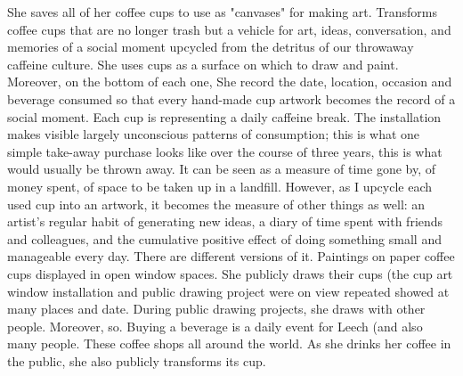 
She saves all of her coffee cups to use as "canvases" for making art. Transforms coffee cups that are no longer trash but a vehicle for art, ideas, conversation, and memories of a social moment upcycled from the detritus of our throwaway caffeine culture. She uses cups as a surface on which to draw and paint. Moreover, on the bottom of each one, She record the date, location, occasion and beverage consumed so that every hand-made cup artwork becomes the record of a social moment. Each cup is representing a daily caffeine break. The installation makes visible largely unconscious patterns of consumption; this is what one simple take-away purchase looks like over the course of three years, this is what would usually be thrown away. It can be seen as a measure of time gone by, of money spent, of space to be taken up in a landfill. However, as I upcycle each used cup into an artwork, it becomes the measure of other things as well: an artist's regular habit of generating new ideas, a diary of time spent with friends and colleagues, and the cumulative positive effect of doing something small and manageable every day. There are different versions of it. Paintings on paper coffee cups displayed in open window spaces. She publicly draws their cups (the cup art window installation and public drawing project were on view repeated showed at many places and date. During public drawing projects, she draws with other people. Moreover, so. Buying a beverage is a daily event for Leech (and also many people. These coffee shops all around the world. As she drinks her coffee in the public, she also publicly transforms its cup.

